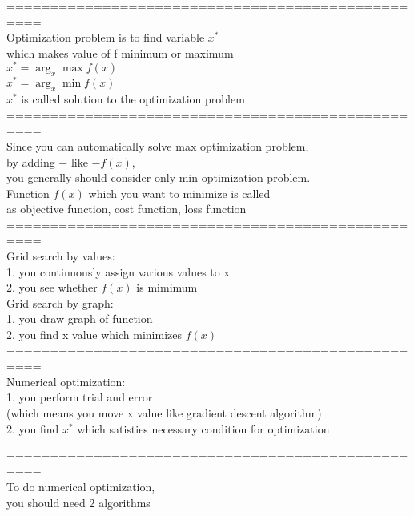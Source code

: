 \documentclass{article}
\begin{document}
==================================================\\
Optimization problem is to find variable $x^*$ \\ 
which makes value of f minimum or maximum \\ 

$x^*=\arg_x \max f(x)$ \\ 
$x^*=\arg_x \min f(x)$ \\ 

$x^*$ is called solution to the optimization problem \\ 

==================================================\\
Since you can automatically solve max optimization problem,\\
by adding $-$ like $-f(x)$,\\
you generally should consider only min optimization problem.\\ 

Function $f(x)$ which you want to minimize is called \\ 
as objective function, cost function, loss function \\

==================================================\\

Grid search by values: \\ 
1. you continuously assign various values to x \\ 
2. you see whether $f(x)$ is mimimum \\

Grid search by graph: \\ 
1. you draw graph of function \\ 
2. you find x value which minimizes $f(x)$ \\

==================================================\\
Numerical optimization: \\ 
1. you perform trial and error \\ 
(which means you move x value like gradient descent algorithm) \\ 
2. you find $x^*$ which satisties necessary condition for optimization

==================================================\\
To do numerical optimization, \\ 
you should need 2 algorithms \\ 
\end{document}
